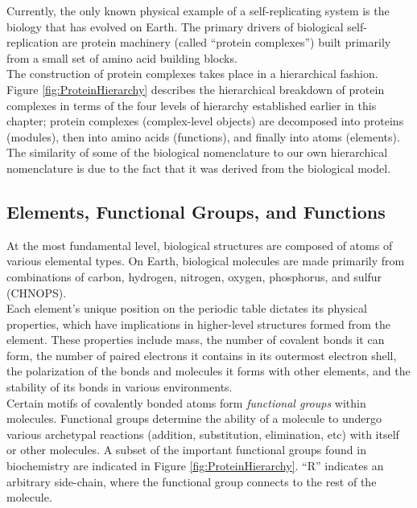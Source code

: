 {Currently, the only known physical example of a self-replicating system is the biology that has evolved on Earth.  The primary drivers of biological self-replication are protein machinery (called ``protein complexes'') built primarily from a small set of amino acid building blocks.\\

The construction of protein complexes takes place in a hierarchical fashion.  Figure \ref{fig:ProteinHierarchy} describes the hierarchical breakdown of protein complexes in terms of the four levels of hierarchy established earlier in this chapter; protein complexes (complex-level objects) are decomposed into proteins (modules), then into amino acids (functions), and finally into atoms (elements).  The similarity of some of the biological nomenclature to our own hierarchical nomenclature is due to the fact that it was derived from the biological model.

\subsection{Elements, Functional Groups, and Functions}

At the most fundamental level, biological structures are composed of atoms of various elemental types.  On Earth, biological molecules are made primarily from combinations of carbon, hydrogen, nitrogen, oxygen, phosphorus, and sulfur (CHNOPS).\\

Each element's unique position on the periodic table dictates its physical properties, which have implications in higher-level structures formed from the element.  These properties include mass, the number of covalent bonds it can form, the number of paired electrons it contains in its outermost electron shell, the polarization of the bonds and molecules it forms with other elements, and the stability of its bonds in various environments.\\

Certain motifs of covalently bonded atoms form \textit{functional groups} within molecules.  Functional groups determine the ability of a molecule to undergo various archetypal reactions (addition, substitution, elimination, etc) with itself or other molecules.  A subset of the important functional groups found in biochemistry are indicated in Figure \ref{fig:ProteinHierarchy}.  ``R'' indicates an arbitrary side-chain, where the functional group connects to the rest of the molecule.\\

}
